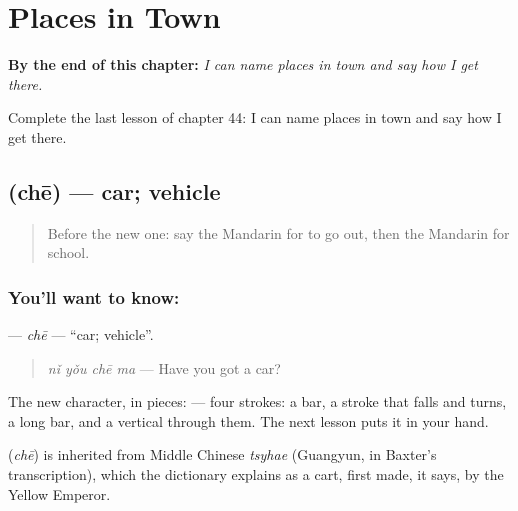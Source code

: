 
\chapter{Places in Town}
\label{ch:zh-places-in-town}

\begin{chapteropening}
\textbf{By the end of this chapter:} \emph{I can name places in town and say how I get there.}

Complete the last lesson of chapter 44: I can name places in town and say how I get there.
\end{chapteropening}

\section[\texorpdfstring{\zh{车} (chē)}{车 (chē)}]{ (chē) — car; vehicle}

\label{lesson:ZH-C44-che}



\begin{quote}
Before the new one: say the Mandarin for to go out, then the Mandarin for school.
\end{quote}

\subsection*{You'll want to know: }
\textbf{} — \emph{chē} — \textquotedblleft{}car; vehicle\textquotedblright{}.

\begin{quote}
\textbf{} \emph{nǐ yǒu chē ma} — Have you got a car?
\end{quote}

The new character, in pieces:  — four strokes: a bar, a stroke that falls and turns, a long bar, and a vertical through them. The next lesson puts it in your hand.

\begin{cousinweb}
\textbf{} (\emph{chē}) is inherited from Middle Chinese \emph{tsyhae} (Guangyun, in Baxter's transcription), which the dictionary explains as a cart, first made, it says, by the Yellow Emperor.
\end{cousinweb}

